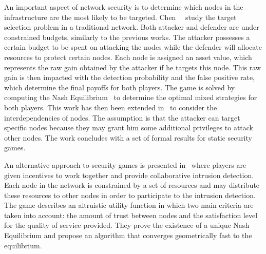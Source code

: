  An important aspect of network security is to determine which nodes in the infrastructure are the most likely to be targeted. 
 Chen~\etal~\cite{Chen2009} study the target selection problem in a traditional network. 
 Both attacker and defender are under constrained budgets, similarly to the previous works.
 The attacker possesses a certain budget to be spent on attacking the nodes while the defender will allocate resources to protect certain nodes.
 Each node is assigned an asset value, which represents the raw gain obtained by the attacker if he targets this node.
 This raw gain is then impacted with the detection probability and the false positive rate, which determine the final payoffs for both players.
 The game is solved by computing the Nash Equilibrium~\cite{nasheq} to determine the optimal mixed strategies for both players.
 This work has then been extended in~\cite{interdep-ismail2017} to consider the interdependencies of nodes.
 The assumption is that the attacker can target specific nodes because they may grant him some additional privileges to attack other nodes.
 The work concludes with a set of formal results for static security games.
 
 An alternative approach to security games is presented in~\cite{Zhu2009b} where players are given incentives to work together and provide collaborative intrusion detection.
 Each node in the network is constrained by a set of resources and may distribute these resources to other nodes in order to participate to the intrusion detection.
 The game describes an altruistic utility function in which two main criteria are taken into account: the amount of trust between nodes and the satisfaction level for the quality of service provided.
 They prove the existence of a unique Nash Equilibrium and propose an algorithm that converges geometrically fast to the equilibrium.

